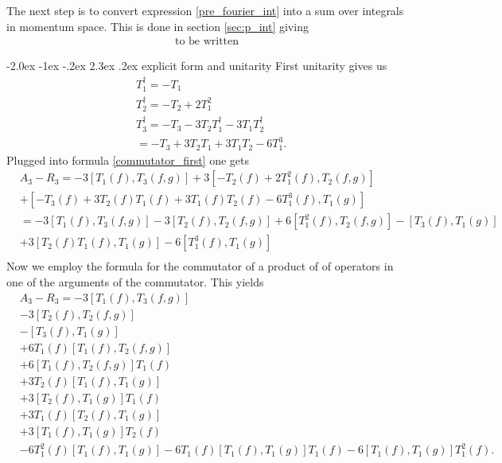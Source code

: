 \documentclass[oneside,reqno,12pt]{amsart}
\makeatletter
\renewcommand\section{\@startsection {section}{1}{\z@}%
                                   {-2.0ex \@plus -1ex \@minus -.2ex}%
                                   {2.3ex \@plus.2ex}%
                                   {\normalfont\Large\bfseries}}
\makeatother
\begin{document}
The next step is to convert expression \eqref{pre_fourier_int} into a sum over integrals in momentum space. This is done in section \ref{sec:p_int} giving
\begin{align}
\tag*{}
\text{to be written}
\end{align}



\section{explicit form and unitarity}\label{sec::ExpUnit}
First unitarity gives us
\begin{align*}
&T_1^\dagger=-T_1\\
&T_2^\dagger=-T_2 +2 T_1^2\\
&T_3^\dagger=-T_3 -3T_2T_1^\dagger-3T_1T_2^\dagger\\
&=-T_3 +3T_2T_1+3T_1T_2-6T_1^3
.\end{align*}
Plugged into formula \ref{commutator_first} one gets
\begin{align*}
&A_3-R_3=-3 \left[T_1(f),T_3(f,g) \right]
+3\left[-T_2(f) +2 T_1^2(f),T_2(f,g)\right]\\
&+\left[-T_3(f) +3T_2(f)T_1(f)+3T_1(f)T_2(f)-6T_1^3(f),T_1(g)\right]\\
&=-3 \left[T_1(f),T_3(f,g) \right]
-3\left[T_2(f),T_2(f,g)\right]
+6\left[ T_1^2(f),T_2(f,g)\right]
-\left[T_3(f) ,T_1(g)\right]\\
&+3\left[T_2(f)T_1(f),T_1(g)\right]
-6\left[T_1^3(f),T_1(g)\right]\\
\end{align*}
Now we employ the formula for the commutator of a product of of operators in one of the arguments of the commutator. This yields
\begin{align}\label{T1-T3_commutator1}
&A_3-R_3=-3 \left[T_1(f),T_3(f,g) \right]\\\label{T1-T3_commutator2}
&-3\left[T_2(f),T_2(f,g)\right]\\\label{T1-T3_commutator3}
&-\left[T_3(f) ,T_1(g)\right]\\\label{T1-T3_commutator4}
&+6T_1(f)\left[ T_1(f),T_2(f,g)\right]\\\label{T1-T3_commutator5}
&+6\left[ T_1(f),T_2(f,g)\right]T_1(f)\\\label{T1-T3_commutator6}
&+3T_2(f)\left[T_1(f),T_1(g)\right]\\\label{T1-T3_commutator7}
&+3\left[T_2(f),T_1(g)\right]T_1(f)\\ \label{T1-T3_commutator8}
&+3 T_1(f)\left[T_2(f),T_1(g)\right]\\ \label{T1-T3_commutator9}
&+3 \left[T_1(f),T_1(g)\right]T_2(f)\\ \label{T1-T3_commutator10}
&-6T_1^2(f)\left[T_1(f),T_1(g)\right]
-6T_1(f)\left[T_1(f),T_1(g)\right]T_1(f)
-6\left[T_1(f),T_1(g)\right]T_1^2(f)
.\end{align}
\end{document}

